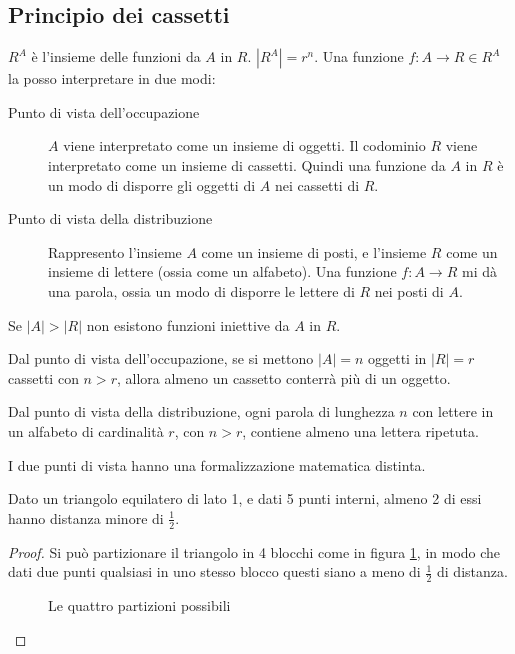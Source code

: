 \subsection{Principio dei cassetti}

$R^A$ \`e l'insieme delle funzioni da $A$ in $R$. $|R^A| = r^n$. Una funzione $f : A \to R \in R^A$ la posso interpretare in due modi:
\begin{description}
  \item[Punto di vista dell'occupazione] $A$ viene interpretato come un insieme di oggetti. Il codominio $R$ viene interpretato come un insieme di cassetti. Quindi una funzione da $A$ in $R$ \`e un modo di disporre gli oggetti di $A$ nei cassetti di $R$.
  \item[Punto di vista della distribuzione] Rappresento l'insieme $A$ come un insieme di posti, e l'insieme $R$ come un insieme di lettere (ossia come un alfabeto). Una funzione $f : A \to R$ mi d\`a una parola, ossia un modo di disporre le lettere di $R$ nei posti di $A$.
\end{description}
\begin{prop}
Se $|A| > |R|$ non esistono funzioni iniettive da $A$ in $R$.
\end{prop}
Dal punto di vista dell'occupazione, se si mettono $|A| = n$ oggetti in $|R| = r$ cassetti con $n > r$, allora almeno un cassetto conterr\`a pi\`u di un oggetto. 

Dal punto di vista della distribuzione, ogni parola di lunghezza $n$ con lettere in un alfabeto di cardinalit\`a $r$, con $n > r$, contiene almeno una lettera ripetuta.

I due punti di vista hanno una formalizzazione matematica distinta.

\begin{prop}
Dato un triangolo equilatero di lato 1, e dati 5 punti interni, almeno 2 di essi hanno distanza minore di $\frac{1}{2}$.
\end{prop}
\begin{proof}
Si pu\`o partizionare il triangolo in 4 blocchi come in figura \ref{fig:triforza}, in modo che dati due punti qualsiasi in uno stesso blocco questi siano a meno di $\frac{1}{2}$ di distanza.
\begin{figure}[ht]
\centering
{}
\caption{\label{fig:triforza}Le quattro partizioni possibili}
\end{figure}
\end{proof}

